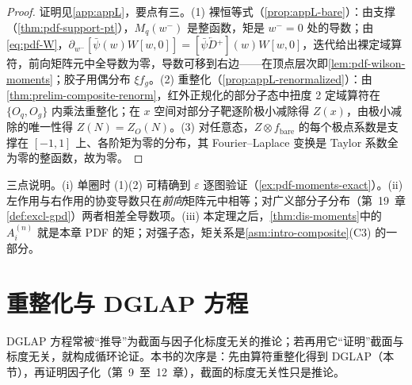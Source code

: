 \begin{proof}
证明见\cref{app:appL}，要点有三。(1) 裸恒等式（\cref{prop:appL-bare}）：由支撑（\cref{thm:pdf-support-pt}），$M_q(w^-)$ 是整函数，矩是 $w^-=0$ 处的导数；由\cref{eq:pdf-W}，$\partial_{w^-}[\bar\psi(w)W[w,0]]=[\bar\psi\overleftarrow{D}{}^+](w)W[w,0]$，迭代给出裸定域算符，前向矩阵元中全导数为零，导数可移到右边——在顶点层次即\cref{lem:pdf-wilson-moments}；胶子用偶分布 $\xi f_g$。(2) 重整化（\cref{prop:appL-renormalized}）：由\cref{thm:prelim-composite-renorm}，红外正规化的部分子态中扭度 2 定域算符在 $\{O_q,O_g\}$ 内乘法重整化；在 $x$ 空间对部分子靶逐阶极小减除得 $Z(x)$，由极小减除的唯一性得 $Z(N)=Z_O(N)$。(3) 对任意态，$Z\otimes f_{\mathrm{bare}}$ 的每个极点系数是支撑在 $[-1,1]$ 上、各阶矩为零的分布，其 Fourier--Laplace 变换是 Taylor 系数全为零的整函数，故为零。
\end{proof}

三点说明。(i) 单圈时 (1)(2) 可精确到 $\varepsilon$ 逐图验证（\cref{ex:pdf-moments-exact}）。(ii) 左作用与右作用的协变导数只在\emph{前向}矩阵元中相等；对广义部分子分布（第~19~章\cref{def:excl-gpd}）两者相差全导数项。(iii) 本定理之后，\cref{thm:dis-moments}中的 $A^{(n)}_i$ 就是本章 PDF 的矩；对强子态，矩关系是\cref{asm:intro-composite}(C3) 的一部分。

\section{重整化与 DGLAP 方程}\label{sec:pdf-dglap}

DGLAP 方程常被“推导”为截面与因子化标度无关的推论；若再用它“证明”截面与标度无关，就构成循环论证。本书的次序是：先由算符重整化得到 DGLAP（本节），再证明因子化（第~9~至~12~章），截面的标度无关性只是推论。

